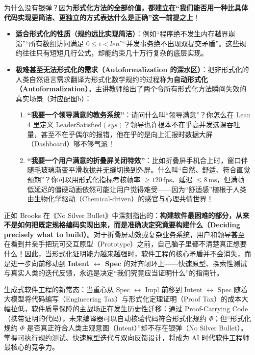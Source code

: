 \documentclass[a4paper]{article}
\begin{document}
为什么没有银弹？因为\textbf{形式化方法的全部价值，都建立在“我们能否用一种比具体代码实现更简洁、更独立的方式表达什么是正确”这一前提之上}！
\begin{itemize}
    \item \textbf{适合形式化的性质（规约远比实现简洁）}：例如“程序绝不发生内存越界崩溃”“所有数组访问满足 $0 \le i < \mathit{len}$”“并发事务绝不出现双提交矛盾”。这些规约往往只有短短几行公式，却能约束几十万行复杂的底层实现。
    \item \textbf{极难甚至无法形式化的需求（Autoformalization 的深水区）}：把非形式化的人类自然语言需求翻译为形式化数学规约的过程称为\textbf{自动形式化（Autoformalization）}。主讲教师给出了两个令所有形式化方法瞬间失效的真实场景（对应配图b）：
    \begin{enumerate}
        \item \textbf{“我要一个领导满意的教务系统”}：请问什么叫“领导满意”？你怎么在 Lean 4 里定义 $\mathrm{LeaderSatisfied}(\mathit{sys})$？领导也许根本不在乎高并发选课吞吐量，甚至不在乎偶尔的报错，他在乎的是向上汇报时数据大屏（Dashboard）够不够气派！
        \item \textbf{“我要一个用户满意的折叠屏关闭特效”}：比如折叠屏手机合上时，窗口伴随毛玻璃渐变平滑收拢并无缝切换到外屏。什么叫“自然、舒适、符合直觉预期”？你可以用形式化指标考核帧率 $\ge 120\,\mathrm{fps}$、延迟 $\le 8\,\mathrm{ms}$，但满帧低延迟的僵硬动画依然可能让用户觉得难受——因为“舒适感”植根于人类由生物化学驱动（Chemical-driven）的感官与心理共情世界！
    \end{enumerate}
\end{itemize}
正如 Brooks 在《No Silver Bullet》中深刻指出的：\textbf{构建软件最困难的部分，从来不是如何把既定规格编码实现出来，而是准确决定究竟要构建什么（Deciding precisely what to build）}。对于折叠屏动效或复杂业务系统，用户和领导甚至在看到并亲手把玩可交互原型（Prototype）之前，自己脑子里都不清楚真正想要什么！因此，当形式化证明能力越来越强时，软件工程的核心矛盾并不会消失，而是进一步向前移动到 \textbf{Intent $\leftrightarrow$ Spec} 的对齐闭环上——快速原型、探索性测试与真实人类的迭代反馈，永远是决定“我们究竟应当证明什么”的指南针。

\begin{importantbox}{生成式软件工程的新常态：当重心从 Spec $\leftrightarrow$ Impl 前移到 Intent $\leftrightarrow$ Spec}
随着大模型将代码编写（Engineering Tax）与形式化定理证明（Proof Tax）的成本大幅拉低，软件质量保障的主战场正在发生历史性迁移：通过 Proof-Carrying Code（携带证明的代码），未来编译器可以自动核验代码符合形式化规约 $\Phi$；但“形式化规约 $\Phi$ 是否真正符合人类主观意图（Intent）”却不存在银弹（No Silver Bullet）。掌握可执行规约测试、快速原型迭代与双向反馈设计，将成为 AI 时代软件工程师最核心的竞争力。
\end{importantbox}
\end{document}
